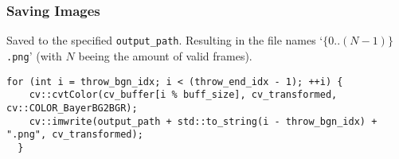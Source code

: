 \subsubsection{Saving Images}
\label{subsubsec:saving_images}

Saved to the specified \texttt{output\_path}.
Resulting in the file names `\texttt{$\{0..(N-1)\}$.png}' (with $N$ beeing the amount of valid frames).

\begin{lstlisting}[style=C++]
  for (int i = throw_bgn_idx; i < (throw_end_idx - 1); ++i) {
    cv::cvtColor(cv_buffer[i % buff_size], cv_transformed, cv::COLOR_BayerBG2BGR);
    cv::imwrite(output_path + std::to_string(i - throw_bgn_idx) + ".png", cv_transformed);
  }
\end{lstlisting}



